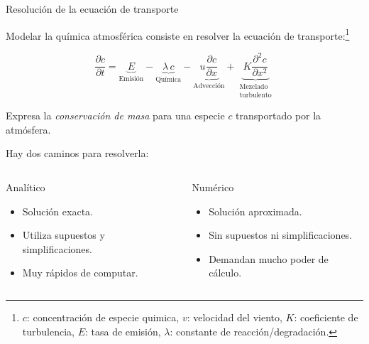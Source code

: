 \subtitle{Modelos Gaussianos}
 \begin{frame}{}
     \maketitle
 \end{frame}

\begin{frame}{Resolución de la ecuación de transporte}

    Modelar la química atmosférica consiste en resolver la \alert{ecuación de transporte}:\footnote{$c$: concentración de especie quimica, $v$: velocidad del viento, $K$: coeficiente de turbulencia, $E$: tasa de emisión, $\lambda$: constante de reacción/degradación.}
    
    $$
    \dfrac{\partial c}{\partial t}  
    =
    \underbrace{E }_{\text{Emisión}}
    -
    \underbrace{\lambda \,c}_{\text{Química}}
    -
    \underbrace{u \dfrac{\partial c}{\partial x}  }_{\text{Advección}}
    +
    \underbrace{K \dfrac{\partial^2 c}{\partial x^2} }_{\begin{smallmatrix}\text{Mezclado}\\ \text{turbulento} \end{smallmatrix}}
    $$
    
    Expresa la \textit{conservación de masa} para una especie $c$ transportado por la atmósfera.\\[.5em]

\pause

Hay dos caminos para resolverla:
\begin{columns}
    \begin{exampleblock}{Analítico}
        \begin{itemize}
            \item Solución exacta. 
            \item Utiliza supuestos y simplificaciones.
            \item Muy rápidos de computar.
        \end{itemize}
    \end{exampleblock}
    
    \begin{alertblock}{Numérico}
        \begin{itemize}
            \item Solución aproximada.
            \item Sin supuestos ni simplificaciones.
            \item Demandan mucho poder de cálculo.
        \end{itemize}
    \end{alertblock}
\end{columns}
\end{frame}

